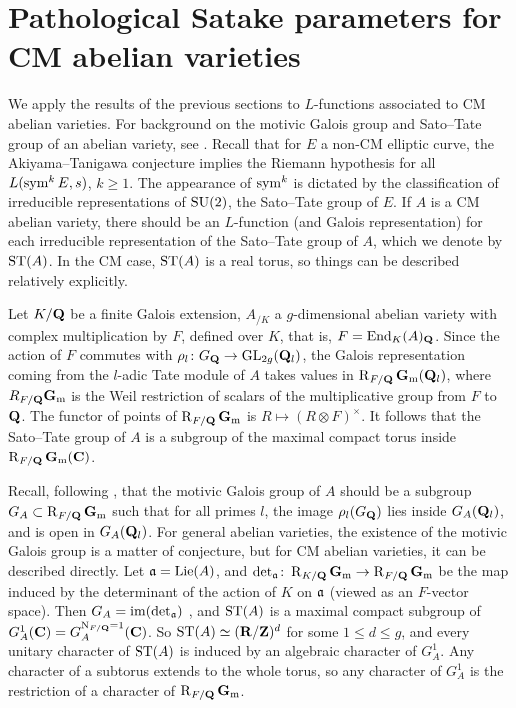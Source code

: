 \section{Pathological Satake parameters for CM abelian varieties}

We apply the results of the previous sections to $L$-functions associated to 
CM abelian varieties. For background on the motivic Galois group and Sato--Tate 
group of an abelian variety, see \cite{serre-tate-1968,serre-1994,yu-2015}. 
Recall that for $E$ a non-CM elliptic curve, the 
Akiyama--Tanigawa conjecture implies the Riemann hypothesis for all 
$L(\operatorname{sym}^k E,s)$, $k\geqslant 1$. The appearance of $\operatorname{sym}^k$ is dictated by the 
classification of irreducible representations of $\operatorname{SU}(2)$, the Sato--Tate group 
of $E$. If $A$ is a CM abelian variety, there should be an $L$-function (and 
Galois representation) for each irreducible representation of the Sato--Tate 
group of $A$, which we denote by $\mathrm{ST}(A)$. In the 
CM case, $\mathrm{ST}(A)$ is a real torus, so things can be described relatively 
explicitly. 

Let $K/\mathbf{Q}$ be a finite Galois extension, $A_{/K}$ a $g$-dimensional abelian 
variety with complex multiplication by $F$, defined over $K$, that is, 
$F = \operatorname{End}_K(A)_{\mathbf{Q}}$. Since the action of $F$ commutes with 
$\rho_l\colon G_{\mathbf{Q}} \to \operatorname{GL}_{2g}(\mathbf{Q}_l)$, the Galois representation coming 
from the $l$-adic Tate module of $A$ takes values in $\operatorname{R}_{F/\mathbf{Q}}\mathbf{G}_\mathrm{m}(\mathbf{Q}_l)$, 
where $R_{F/\mathbf{Q}} \mathbf{G}_\mathrm{m}$ is the Weil restriction of scalars of the multiplicative 
group from $F$ to $\mathbf{Q}$. The functor of points of $\operatorname{R}_{F/\mathbf{Q}}\mathbf{G}_\mathrm{m}$ is 
$R\mapsto (R\otimes F)^\times$. It follows that the Sato--Tate group of $A$ is 
a subgroup of the maximal compact torus inside $\operatorname{R}_{F/\mathbf{Q}}\mathbf{G}_\mathrm{m}(\mathbf{C})$. 

Recall, following \cite{serre-1994}, that the motivic Galois group of $A$ 
should be a subgroup $G_A\subset \operatorname{R}_{F/\mathbf{Q}}\mathbf{G}_\mathrm{m}$ such that for all primes $l$, 
the image $\rho_l(G_{\mathbf{Q}})$ lies inside $G_A(\mathbf{Q}_l)$, and is open in 
$G_A(\mathbf{Q}_l)$. For general abelian varieties, the existence of the motivic 
Galois group is a matter of conjecture, but for CM abelian varieties, it can be 
described directly. Let $\mathfrak{a}=\operatorname{Lie}(A)$, and 
$\det_{\mathfrak{a}}\colon \operatorname{R}_{K/\mathbf{Q}}\mathbf{G}_\mathrm{m} \to \operatorname{R}_{F/\mathbf{Q}}\mathbf{G}_\mathrm{m}$ be the map induced by the 
determinant of the action of $K$ on $\mathfrak{a}$ (viewed as an $F$-vector space). Then 
$G_A = \operatorname{im}(\det_{\mathfrak{a}})$ \cite{yu-2015}, and $\mathrm{ST}(A)$ is a maximal compact 
subgroup of $G_A^1(\mathbf{C}) = G_A^{\operatorname{N}_{F/\mathbf{Q}} = 1}(\mathbf{C})$. So 
$\mathrm{ST}(A) \simeq (\mathbf{R}/\mathbf{Z})^d$ for some $1\leqslant d \leqslant g$, and every 
unitary character of $\mathrm{ST}(A)$ is induced by an algebraic character of 
$G_A^1$. Any character of a subtorus extends to the whole torus, so any 
character of $G_A^1$ is the restriction of a character of $\operatorname{R}_{F/\mathbf{Q}}\mathbf{G}_\mathrm{m}$. 

